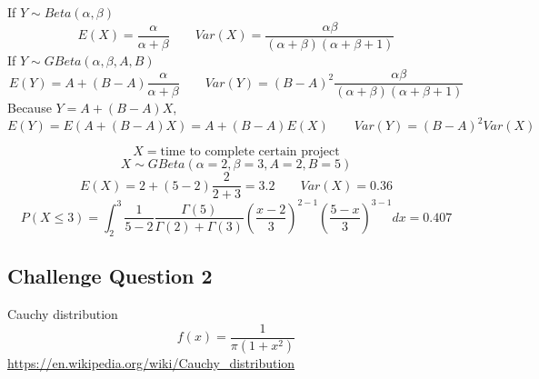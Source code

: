 \begin{prop}
If $Y \sim Beta(\alpha,\beta)$
\[E(X)=\frac{\alpha}{\alpha+\beta} \qquad Var(X)=\frac{\alpha\beta}{(\alpha+\beta)(\alpha+\beta+1)}\]
If $Y \sim GBeta(\alpha,\beta,A,B)$
\[E(Y)=A+(B-A)\frac{\alpha}{\alpha+\beta} \qquad Var(Y)=(B-A)^2 \frac{\alpha\beta}{(\alpha+\beta)(\alpha+\beta+1)} \]
Because $Y=A+(B-A)X$, \[E(Y)=E(A+(B-A)X)=A+(B-A)E(X) \qquad Var(Y)=(B-A)^2 Var(X)\]
\end{prop}

\begin{exmp}
\[X=\text{time to complete certain project}\]
\[X \sim GBeta(\alpha=2,\beta=3,A=2,B=5)\]
\[E(X)=2 + (5-2)\frac{2}{2+3}=3.2 \qquad Var(X)=0.36\]
\[P(X \leq 3)=\int_{2}^{3} \frac{1}{5-2}\frac{\Gamma(5)}{\Gamma(2)+\Gamma(3)}\left(\frac{x-2}{3}\right)^{2-1}\left(\frac{5-x}{3}\right)^{3-1} dx=\boxed{0.407}\]
\end{exmp}

\subsection{Challenge Question 2}
Cauchy distribution
\[f(x)=\frac{1}{\pi(1+x^2)}\]
\url{https://en.wikipedia.org/wiki/Cauchy_distribution}